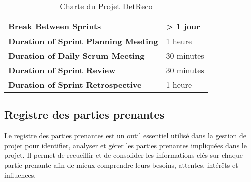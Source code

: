 \begin{table}[h]
\begin{tabular}{|p{4cm}|p{12.5cm}|}
        \hline
        \textbf{Break Between Sprints}               & > 1 jour                                                                                                                                                                                                                                                                                                      \\
        \hline
        \textbf{Duration of Sprint Planning Meeting} & 1 heure                                                                                                                                                                                                                                                                                                       \\
        \hline
        \textbf{Duration of Daily Scrum Meeting}     & 30 minutes                                                                                                                                                                                                                                                                                                    \\
        \hline
        \textbf{Duration of Sprint Review}           & 30 minutes                                                                                                                                                                                                                                                                                                    \\
        \hline
        \textbf{Duration of Sprint Retrospective}    & 1 heure                                                                                                                                                                                                                                                                                                       \\
        \hline
    \end{tabular}
    \caption{Charte du Projet DetReco}
\end{table}


\clearpage
\subsection{Registre des parties prenantes}

Le registre des parties prenantes est un outil essentiel utilisé dans la gestion de projet pour identifier, analyser et gérer les parties prenantes impliquées dans le projet.
Il permet de recueillir et de consolider les informations clés sur chaque partie prenante afin de mieux comprendre leurs besoins, attentes, intérêts et influences.

